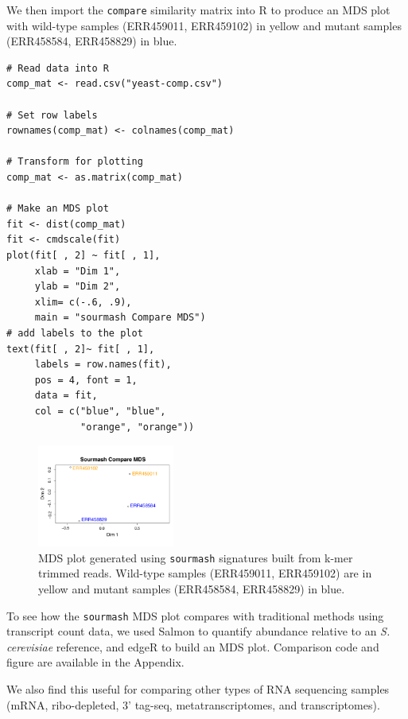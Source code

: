 \documentclass[10pt,a4paper,twocolumn]{article}
\begin{document}
We then import the \lstinline{compare} similarity matrix into R to produce an MDS plot with wild-type samples (ERR459011, ERR459102) in yellow and mutant samples (ERR458584, ERR458829) in blue.

\begin{lstlisting}
# Read data into R
comp_mat <- read.csv("yeast-comp.csv")

# Set row labels
rownames(comp_mat) <- colnames(comp_mat)

# Transform for plotting
comp_mat <- as.matrix(comp_mat)

# Make an MDS plot
fit <- dist(comp_mat)
fit <- cmdscale(fit)
plot(fit[ , 2] ~ fit[ , 1], 
     xlab = "Dim 1", 
     ylab = "Dim 2",
     xlim= c(-.6, .9),
     main = "sourmash Compare MDS")
# add labels to the plot
text(fit[ , 2]~ fit[ , 1], 
     labels = row.names(fit), 
     pos = 4, font = 1,
     data = fit, 
     col = c("blue", "blue", 
             "orange", "orange"))
\end{lstlisting}

\begin{figure}
\centering
\includegraphics[width=0.4\textwidth]{sourmash-mds_f1000_fig1_biggerlabels.pdf}
\caption{\label{fig:sourmash-mds} MDS plot generated using \lstinline{sourmash} signatures built from k-mer trimmed reads. Wild-type samples (ERR459011, ERR459102) are in yellow and mutant samples (ERR458584, ERR458829) in blue. }
\end{figure}

To see how the \lstinline{sourmash} MDS plot compares with traditional methods using transcript count data, we used Salmon \cite{patro2017salmon} to quantify abundance relative to an \textit{S. cerevisiae} reference, and edgeR \cite{robinson2010edger} to build an MDS plot. Comparison code and figure are available in the Appendix.

We also find this useful for comparing other types of RNA sequencing samples (mRNA, ribo-depleted, 3' tag-seq, metatranscriptomes, and transcriptomes). 
\end{document}

